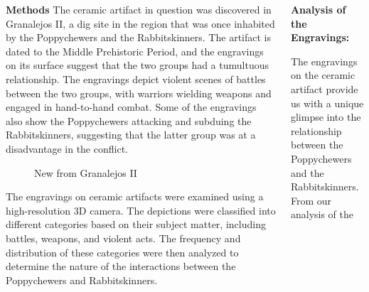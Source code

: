 \documentclass[final]{beamer}
\begin{document}
\begin{frame}[t]
\begin{columns}[t]
    \begin{block}{\textbf{Methods}}
        \small  
        The ceramic artifact in question was discovered in Granalejos II, a dig site in the region that was once inhabited by the Poppychewers and the Rabbitskinners. The artifact is dated to the Middle Prehistoric Period, and the engravings on its surface suggest that the two groups had a tumultuous relationship. The engravings depict violent scenes of battles between the two groups, with warriors wielding weapons and engaged in hand-to-hand combat. Some of the engravings also show the Poppychewers attacking and subduing the Rabbitskinners, suggesting that the latter group was at a disadvantage in the conflict.

            \begin{figure}
                \label{fig:granalejos}
                \centering
                \caption{New from Granalejos II}
            \end{figure}
        The engravings on ceramic artifacts were examined using a high-resolution 3D camera. The depictions were classified into different categories based on their subject matter, including battles, weapons, and violent acts. The frequency and distribution of these categories were then analyzed to determine the nature of the interactions between the Poppychewers and Rabbitskinners.
        \end{block}

        \begin{block}{\textbf{Analysis of the Engravings:}}
            

            The engravings on the ceramic artifact provide us with a unique glimpse into the relationship between the Poppychewers and the Rabbitskinners. From our analysis of the


\end{block}
\end{columns}
\end{frame}
\end{document}
